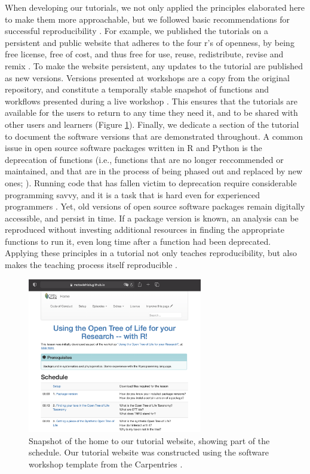 \documentclass[12pt]{article}
\begin{document}
When developing our tutorials, we not only applied the principles elaborated here to make them more approachable,
but we followed basic recommendations for successful reproducibility \citep{sandve2013ten}.
For example, we published the tutorials on a persistent and public website \citep{RopentreeTutorials} that adheres to the four r's of openness, by being free license, free of cost, and thus free for use, reuse, redistribute, revise and remix \citep{hilton2010four}.
To make the website persistent, any updates to the tutorial are published as new versions.
Versions presented at workshops are a copy from the original repository, and constitute a temporally stable snapshot of functions and workflows presented during a live workshop \citep{wilson2006swc, SWCwebsite}.
This ensures that the tutorials are available for the users to return to any time they need it, and to be shared with other users and learners (Figure \ref{fig:schedule}).
Finally, we dedicate a section of the tutorial to document the software versions that are demonstrated throughout. 
A common issue in open source software packages written in R and Python is the deprecation of functions (i.e., functions that are no longer reccommended or maintained, and that are in the process of being phased out and replaced by new ones; \citealt{deprecation2017, vadlamani2021apiscanner}). Running code that has fallen victim to deprecation require considerable programming savvy, and it is a task that is hard even for experienced programmers \citep{vadlamani2021apiscanner}. Yet, old versions of open source software packages remain digitally accessible, and persist in time. If a package version is known, an analysis can be reproduced without investing additional resources in finding the appropriate functions to run it, even long time after a function had been deprecated. 
Applying these principles in a tutorial not only teaches reproducibility, but also makes the teaching process itself reproducible \citep{dogucu_tools_2022}.

\begin{figure}
\begin{center}
\includegraphics[width=3in]{fig_schedule.png}
\end{center}
\caption{Snapshot of the home to our tutorial website, showing part of the schedule.
 Our tutorial website was constructed using the software workshop template from the Carpentries \citep{swc-workshop-template}. \label{fig:schedule}}
\end{figure}
\end{document}
